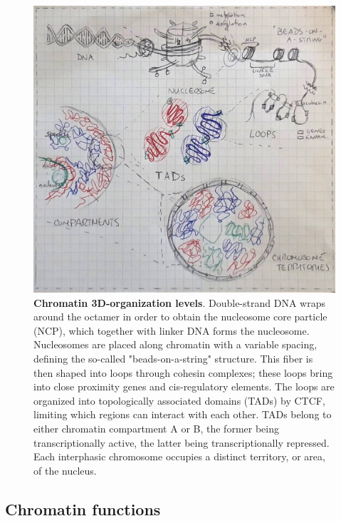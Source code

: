 \begin{figure}[ht]
  \centering
  \includegraphics[width=1\textwidth]{chromatin_organization.jpeg}
  \caption{\textbf{Chromatin 3D-organization levels}. Double-strand DNA wraps around the octamer in order to obtain the nucleosome core particle (NCP), which together with linker DNA forms the nucleosome. Nucleosomes are placed along chromatin with a variable spacing, defining the so-called "beads-on-a-string" structure. This fiber is then shaped into loops through cohesin complexes; these loops bring into close proximity genes and cis-regulatory elements. The loops are organized into topologically associated domains (TADs) by CTCF, limiting which regions can interact with each other. TADs belong to either chromatin compartment A or B, the former being transcriptionally active, the latter being transcriptionally repressed. Each interphasic chromosome occupies a distinct territory, or area, of the nucleus.}
  \label{fig:chromatin}
\end{figure}

\subsection{Chromatin functions}

